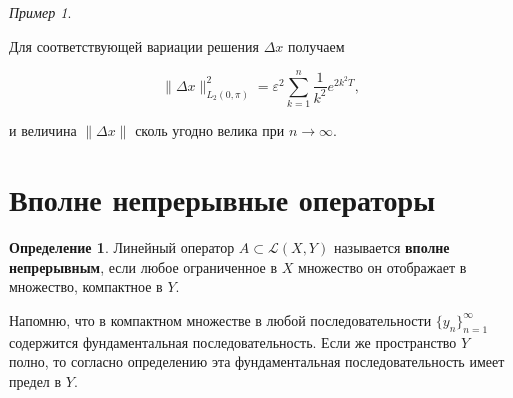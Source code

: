 \documentclass[12pt,a4paper,titlepage,oneside]{book}
\theoremstyle{definition}
\newtheorem*{definition}{Определение}
\theoremstyle{plain}
\theoremstyle{break}
\theoremstyle{remark}
\theoremstyle{remark}
\newtheorem*{example}{Пример}
\theoremstyle{remark}
\theoremstyle{remark}
\theoremstyle{plain}
\theoremstyle{plain}
\begin{document}
\begin{example}
\begin{enumerate}
Для соответствующей вариации решения $\Delta x$ получаем
\begin{center}
$$\| \Delta x \|_{L_2(0, \pi)}^2 = \varepsilon ^2 \sum\limits_{k=1}^n \frac{1}{k^2} e^{2 k^2 T},$$
\end{center}
и величина $\| \Delta x \|$ сколь угодно велика при $n \longrightarrow \infty.$

\end{enumerate}

\end{example}

\section{Вполне непрерывные операторы}
\begin{definition}Линейный оператор $A \subset \mathcal{L}(X, Y)$ называется \textbf{вполне непрерывным}, если любое ограниченное в $X$ множество он отображает в множество, компактное в $Y$.
\end{definition}
Напомню, что в компактном множестве в любой последовательности $\lbrace y_n \rbrace_{n=1}^{\infty}$ содержится фундаментальная последовательность. Если же пространство $Y$ полно, то согласно определению эта фундаментальная последовательность имеет предел в $Y$.
\end{document}
